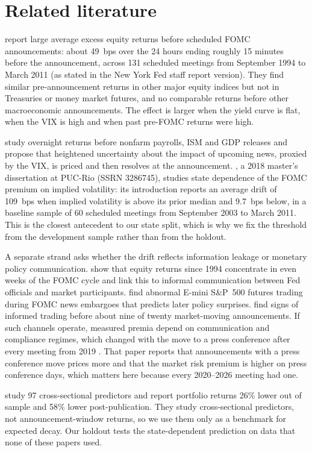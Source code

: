 \section{Related literature}
\citet{lucca2015} report large average excess equity returns before scheduled FOMC announcements: about 49~bps over the 24 hours ending roughly 15 minutes before the announcement, across 131 scheduled meetings from September 1994 to March 2011 (as stated in the New York Fed staff report version). They find similar pre-announcement returns in other major equity indices but not in Treasuries or money market futures, and no comparable returns before other macroeconomic announcements. The effect is larger when the yield curve is flat, when the VIX is high and when past pre-FOMC returns were high.

\citet{hu2022} study overnight returns before nonfarm payrolls, ISM and GDP releases and propose that heightened uncertainty about the impact of upcoming news, proxied by the VIX, is priced and then resolves at the announcement. \citet{martello2018}, a 2018 master's dissertation at PUC-Rio (SSRN 3286745), studies state dependence of the FOMC premium on implied volatility: its introduction reports an average drift of 109~bps when implied volatility is above its prior median and 9.7~bps below, in a baseline sample of 60 scheduled meetings from September 2003 to March 2011. This is the closest antecedent to our state split, which is why we fix the threshold from the development sample rather than from the holdout.

A separate strand asks whether the drift reflects information leakage or monetary policy communication. \citet{cieslak2019} show that equity returns since 1994 concentrate in even weeks of the FOMC cycle and link this to informal communication between Fed officials and market participants. \citet{bernile2016} find abnormal E-mini S\&P~500 futures trading during FOMC news embargoes that predicts later policy surprises. \citet{kurov2019} find signs of informed trading before about nine of twenty market-moving announcements. If such channels operate, measured premia depend on communication and compliance regimes, which changed with the move to a press conference after every meeting from 2019 \citep{boguth2019}. That paper reports that announcements with a press conference move prices more and that the market risk premium is higher on press conference days, which matters here because every 2020--2026 meeting had one.

\citet{mclean2016} study 97 cross-sectional predictors and report portfolio returns 26\% lower out of sample and 58\% lower post-publication. They study cross-sectional predictors, not announcement-window returns, so we use them only as a benchmark for expected decay. Our holdout tests the state-dependent prediction on data that none of these papers used.